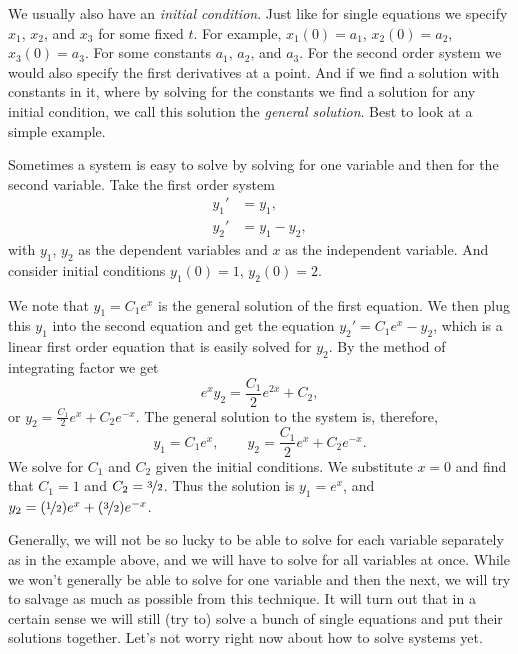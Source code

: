 We usually also have an
\emph{initial condition}.  Just like
for single equations we specify $x_1$, $x_2$, and $x_3$ for some fixed $t$.
For example, $x_1(0) = a_1$, $x_2(0) = a_2$, $x_3(0) = a_3$.
For some constants $a_1$, $a_2$, and $a_3$.  For the second order system
we would also specify the first derivatives at a point.
And if we find a solution with constants in it, where by solving for the
constants we find a solution for any initial condition, we call this
solution the \emph{general solution}.
Best to look at a simple example.

\begin{example}
Sometimes a system is easy to solve
by solving for one variable and then for the second variable.
Take 
the first order system
\begin{align*}
y_1' & = y_1 , \\
y_2' & = y_1 - y_2 ,
\end{align*}
with $y_1$, $y_2$ as the dependent variables and $x$ as the independent
variable.  And consider initial conditions
$y_1(0) = 1$, $y_2(0) = 2$.

We note that $y_1 = C_1 e^x$ is the general solution of the first equation.
We then plug this $y_1$ into the second equation
and get the equation $y_2' = C_1e^x - y_2$, which is a linear first order
equation that is easily solved for $y_2$.  By the method of integrating
factor we get
\begin{equation*}
e^x y_2 = \frac{C_1}{2}e^{2x} + C_2 ,
\end{equation*}
or $y_2 = \frac{C_1}{2}e^{x} + C_2e^{-x}$.  The general solution to the system
is, therefore,
\begin{equation*}
y_1 = C_1 e^x , \qquad
y_2 = \frac{C_1}{2}e^{x} + C_2e^{-x} .
\end{equation*}
We solve for $C_1$ and $C_2$ given the initial conditions.
We substitute $x=0$ and find
that $C_1=1$ and $C_2=\nicefrac{3}{2}$.  Thus the solution is
$y_1 = e^x$, and
$y_2 = (\nicefrac{1}{2}) e^x + (\nicefrac{3}{2}) e^{-x}$.
\end{example}

Generally, we will not be so lucky to be able to solve for
each variable separately as in the 
example above, and we will have to solve for all variables at once.
While we won't generally be able to solve for one variable and then the
next, we will try to salvage as much as possible from this technique.
It will turn out that in a certain sense we will still (try to) solve
a bunch of single equations and put their solutions together.  Let's not
worry right now about how to solve systems yet.

